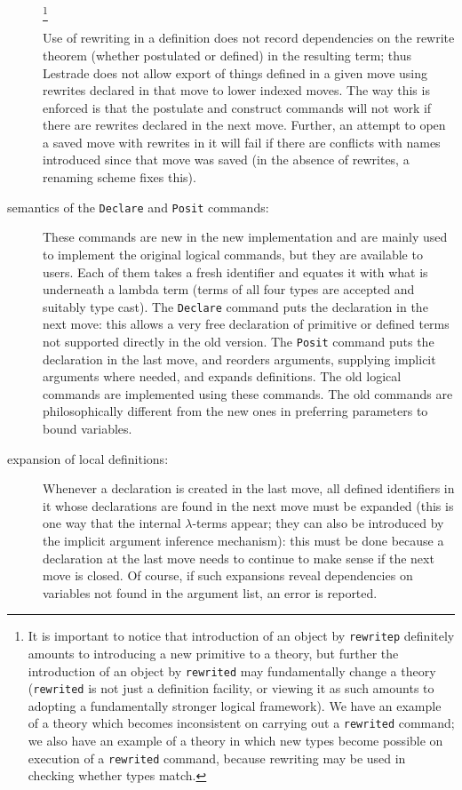 \documentclass[12pt]{article}
\begin{document}
\begin{description}
\footnote{It is important to notice that introduction of an object by {\tt rewritep} definitely amounts to introducing a new primitive to a theory, but further the introduction of an object by {\tt rewrited} may fundamentally change a theory ({\tt rewrited} is not just a definition facility, or viewing it as such amounts to adopting a fundamentally stronger logical framework).  We have an example of a theory which becomes inconsistent on carrying out a {\tt rewrited} command;  we also have an example of a theory in which new types become possible on execution of a {\tt rewrited} command, because rewriting may be used in checking whether types match.}

Use of rewriting in a definition does not record dependencies on the rewrite theorem (whether postulated or defined) in the resulting term;  thus Lestrade does not allow export of things
defined in a given move using rewrites declared in that move to lower indexed moves.  The way this is enforced is that the postulate and construct commands will not work if there are rewrites declared in the next move.  Further, an attempt to open a saved move with rewrites in it will fail if there are conflicts with names introduced since that move was saved (in the absence of rewrites, a renaming scheme fixes this).

\item[semantics of the {\tt Declare} and {\tt Posit} commands:]  These commands are new in the new implementation and are mainly used to implement the original logical commands, but they are available to users.  Each of them takes a fresh identifier and equates it with what is underneath a lambda term (terms of all four types are accepted and suitably type cast).
The {\tt Declare} command puts the declaration in the next move:  this allows a very free declaration of primitive or defined terms not supported directly in the old version.
The {\tt Posit} command puts the declaration in the last move, and reorders arguments, supplying implicit arguments where needed, and expands definitions.  The old logical commands are implemented using these commands.  The old commands are philosophically different from the new ones in preferring parameters to bound variables.

\item[expansion of local definitions:]  Whenever a declaration is created in the last move, all defined identifiers in it whose declarations are found in the next move must be expanded (this is one
way that the internal $\lambda$-terms appear; they can also be introduced by the implicit argument inference mechanism):  this must be done because a declaration at the last move needs to continue to make sense if the next move is closed.
Of course, if such expansions reveal dependencies on variables not found in the argument list, an error is reported.


\end{description}
\end{document}
